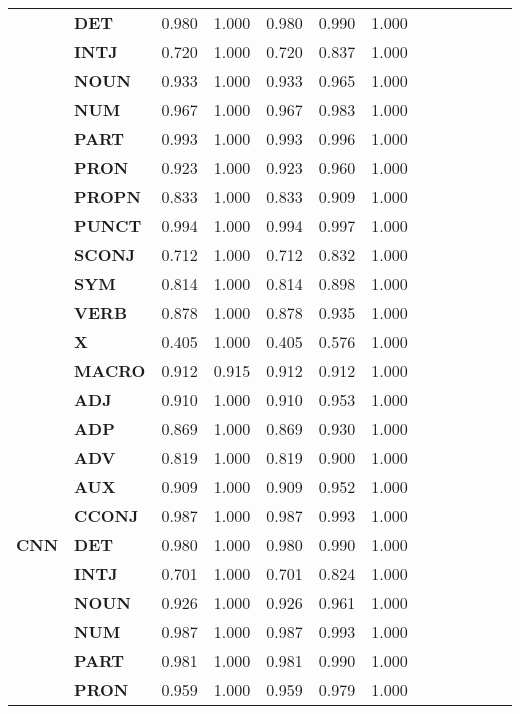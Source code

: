 \begin{longtable}{|l||l||l||l||l||l||l||l||l||l||l||l||l|}
\textbf{} & \textbf{DET} & 0.980 & 1.000 & 0.980 & 0.990 & 1.000 \\
\textbf{} & \textbf{INTJ} & 0.720 & 1.000 & 0.720 & 0.837 & 1.000 \\
\textbf{} & \textbf{NOUN} & 0.933 & 1.000 & 0.933 & 0.965 & 1.000 \\
\textbf{} & \textbf{NUM} & 0.967 & 1.000 & 0.967 & 0.983 & 1.000 \\
\textbf{} & \textbf{PART} & 0.993 & 1.000 & 0.993 & 0.996 & 1.000 \\
\textbf{} & \textbf{PRON} & 0.923 & 1.000 & 0.923 & 0.960 & 1.000 \\
\textbf{} & \textbf{PROPN} & 0.833 & 1.000 & 0.833 & 0.909 & 1.000 \\
\textbf{} & \textbf{PUNCT} & 0.994 & 1.000 & 0.994 & 0.997 & 1.000 \\
\textbf{} & \textbf{SCONJ} & 0.712 & 1.000 & 0.712 & 0.832 & 1.000 \\
\textbf{} & \textbf{SYM} & 0.814 & 1.000 & 0.814 & 0.898 & 1.000 \\
\textbf{} & \textbf{VERB} & 0.878 & 1.000 & 0.878 & 0.935 & 1.000 \\
\textbf{} & \textbf{X} & 0.405 & 1.000 & 0.405 & 0.576 & 1.000 \\
\textbf{} & \textbf{MACRO} & 0.912 & 0.915 & 0.912 & 0.912 & 1.000 \\
\cline{1-7}
\multirow[t]{18}{*}{\textbf{CNN}} & \textbf{ADJ} & 0.910 & 1.000 & 0.910 & 0.953 & 1.000 \\
\textbf{} & \textbf{ADP} & 0.869 & 1.000 & 0.869 & 0.930 & 1.000 \\
\textbf{} & \textbf{ADV} & 0.819 & 1.000 & 0.819 & 0.900 & 1.000 \\
\textbf{} & \textbf{AUX} & 0.909 & 1.000 & 0.909 & 0.952 & 1.000 \\
\textbf{} & \textbf{CCONJ} & 0.987 & 1.000 & 0.987 & 0.993 & 1.000 \\
\textbf{} & \textbf{DET} & 0.980 & 1.000 & 0.980 & 0.990 & 1.000 \\
\textbf{} & \textbf{INTJ} & 0.701 & 1.000 & 0.701 & 0.824 & 1.000 \\
\textbf{} & \textbf{NOUN} & 0.926 & 1.000 & 0.926 & 0.961 & 1.000 \\
\textbf{} & \textbf{NUM} & 0.987 & 1.000 & 0.987 & 0.993 & 1.000 \\
\textbf{} & \textbf{PART} & 0.981 & 1.000 & 0.981 & 0.990 & 1.000 \\
\textbf{} & \textbf{PRON} & 0.959 & 1.000 & 0.959 & 0.979 & 1.000 \\

\end{longtable}
